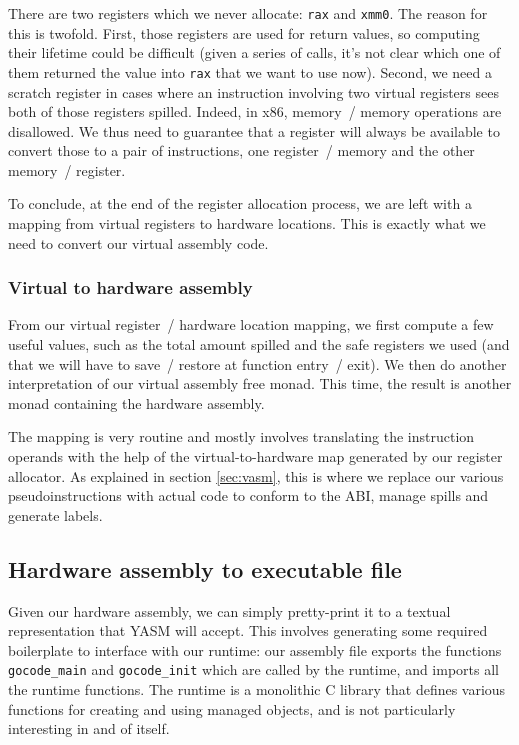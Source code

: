 \documentclass[letterpaper,11pt]{article}
\begin{document}
There are two registers which we never allocate: \texttt{rax} and \texttt{xmm0}. The reason for this is twofold. First, those registers are used for return values, so computing their lifetime could be difficult (given a series of calls, it's not clear which one of them returned the value into \texttt{rax} that we want to use now). Second, we need a scratch register in cases where an instruction involving two virtual registers sees both of those registers spilled. Indeed, in x86, memory~/ memory operations are disallowed. We thus need to guarantee that a register will always be available to convert those to a pair of instructions, one register~/ memory and the other memory~/ register.

To conclude, at the end of the register allocation process, we are left with a mapping from virtual registers to hardware locations. This is exactly what we need to convert our virtual assembly code.

\subsubsection{Virtual to hardware assembly}

From our virtual register~/ hardware location mapping, we first compute a few useful values, such as the total amount spilled and the safe registers we used (and that we will have to save~/ restore at function entry~/ exit). We then do another interpretation of our virtual assembly free monad. This time, the result is another monad containing the hardware assembly.

The mapping is very routine and mostly involves translating the instruction operands with the help of the virtual-to-hardware map generated by our register allocator. As explained in section \ref{sec:vasm}, this is where we replace our various pseudoinstructions with actual code to conform to the ABI, manage spills and generate labels.

\subsection{Hardware assembly to executable file}

Given our hardware assembly, we can simply pretty-print it to a textual representation that YASM will accept. This involves generating some required boilerplate to interface with our runtime: our assembly file exports the functions \texttt{gocode\_main} and \texttt{gocode\_init} which are called by the runtime, and imports all the runtime functions. The runtime is a monolithic C library that defines various functions for creating and using managed objects, and is not particularly interesting in and of itself.
\end{document}
